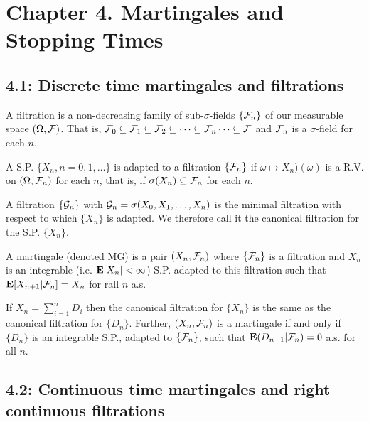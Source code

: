 \section*{Chapter 4. Martingales and Stopping Times}
\subsection*{4.1: Discrete time martingales and filtrations}
\begin{definition*} 
A filtration is a non-decreasing family of sub-$\sigma$-fields $\{\mathcal{F}_n\}$ of our
measurable space $(\Omega, \mathcal{F})$. That is, $\mathcal{F}_0 \subseteq \mathcal{F}_1 \subseteq \mathcal{F}_2
\subseteq \cdots \subseteq \mathcal{F}_n \cdots \subseteq \mathcal{F}$ and $\mathcal{F}_n$ is a
$\sigma$-field for each $n$.
\end{definition*} 

\begin{definition*} 
A S.P. $\{X_n, n = 0, 1, \dots\}$ is adapted to a filtration $\{\mathcal{F}_n\}$ if
$\omega \mapsto X_n)(\omega)$ is a R.V. on $(\Omega, \mathcal{F}_n)$ for each $n$, that
is, if $\sigma(X_n) \subseteq \mathcal{F}_n$ for each $n$.
\end{definition*} 

\begin{definition*} 
A filtration $\{\mathcal{G}_n\}$ with $\mathcal{G}_n = \sigma(X_0, X_1, \dots, X_n)$ is the
minimal filtration with respect to which $\{X_n\}$ is adapted. We therefore call
it the canonical filtration for the S.P. $\{X_n\}$.
\end{definition*} 

\begin{definition*} 
A martingale (denoted MG) is a pair $(X_n, \mathcal{F}_n)$ where $\{\mathcal{F}_n\}$ is a
filtration and $X_n$ is an integrable (i.e. $\mathbf{E}|X_n| < \infty$) S.P. adapted to
this filtration such that $\mathbf{E}[X_{n+1} | \mathcal{F}_n] = X_n$ for rall $n$ a.s.
\end{definition*}

\begin{proposition*} 
If $X_n = \sum_{i=1}^n D_i$ then the canonical filtration for $\{X_n\}$ is the
same as the canonical filtration for $\{D_n\}$. Further, $(X_n, \mathcal{F}_n)$ is a
martingale if and only if $\{D_n\}$ is an integrable S.P., adapted to
$\{\mathcal{F}_n\}$, such that $\mathbf{E}(D_{n+1} | \mathcal{F}_n) = 0$ a.s. for all $n$.
\end{proposition*} 

\subsection*{4.2: Continuous time martingales and right continuous filtrations}

